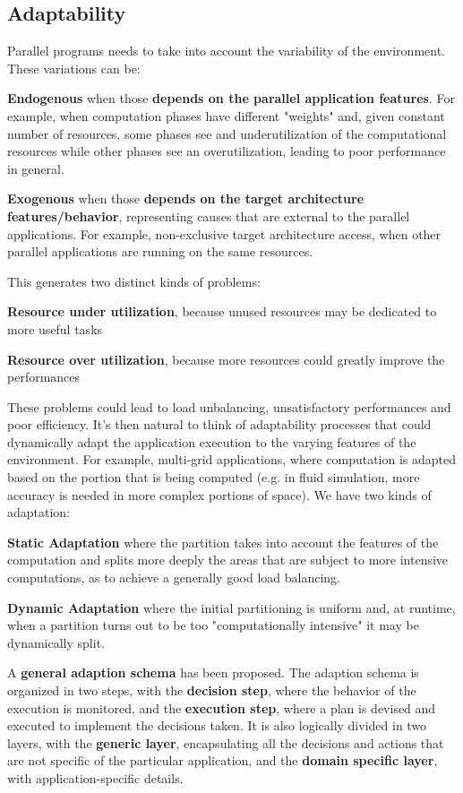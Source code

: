 \documentclass[10pt]{report}
\begin{document}
\subsection{Adaptability}
Parallel programs needs to take into account the variability of the environment. These variations can be:
\begin{list}{}{}
	\item \textbf{Endogenous} when those \textbf{depends on the parallel application features}. For example, when computation phases have different "weights" and, given constant number of resources, some phases see and underutilization of the computational resources while other phases see an overutilization, leading to poor performance in general.
	\item \textbf{Exogenous} when those \textbf{depends on the target architecture features/behavior}, representing causes that are external to the parallel applications. For example, non-exclusive target architecture access, when other parallel applications are running on the same resources.
\end{list}
This generates two distinct kinds of problems:
\begin{list}{}{}
	\item \textbf{Resource under utilization}, because unused resources may be dedicated to more useful tasks
	\item \textbf{Resource over utilization}, because more resources could greatly improve the performances
\end{list}
These problems could lead to load unbalancing, unsatisfactory performances and poor efficiency. It's then natural to think of adaptability processes that could dynamically adapt the application execution to the varying features of the environment. For example, multi-grid applications, where computation is adapted based on the portion that is being computed (e.g. in fluid simulation, more accuracy is needed in more complex portions of space). We have two kinds of adaptation:
\begin{list}{}{}
	\item \textbf{Static Adaptation} where the partition takes into account the features of the computation and splits more deeply the areas that are subject to more intensive computations, as to achieve a generally good load balancing.
	\item \textbf{Dynamic Adaptation} where the initial partitioning is uniform and, at runtime, when a partition turns out to be too "computationally intensive" it may be dynamically split.
\end{list}
A \textbf{general adaption schema} has been proposed. The adaption schema is organized in two steps, with the \textbf{decision step}, where the behavior of the execution is monitored, and the \textbf{execution step}, where a plan is devised and executed to implement the decisions taken. It is also logically divided in two layers, with the \textbf{generic layer}, encapsulating all the decisions and actions that are not specific of the particular application, and the \textbf{domain specific layer}, with application-specific details.
\end{document}
